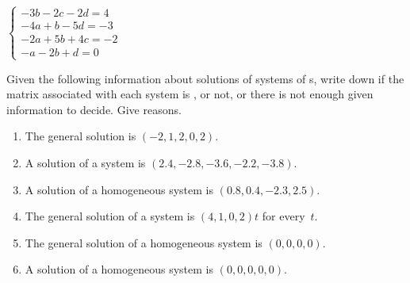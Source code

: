 \begin{exercise}
\begin{Parts}
\begin{OmitV1}
\item \(\begin{cases}-3b-2c-2d=4
\\-4a+b-5d=-3
\\-2a+5b+4c=-2
\\-a-2b+d=0 \end{cases}\)
\end{OmitV1}

\end{Parts}
\end{exercise}




\begin{exercise}  
Given the following information about solutions of systems of s, write down if the matrix associated with each system is , or not, or there is not enough given information to decide.  
Give reasons.
\begin{enumerate}
\item The general solution is \((-2,1,2,0,2)\).

\item A solution of a system is \((2.4,-2.8,-3.6,-2.2,-3.8)\).

\item A solution of a homogeneous system is \((0.8,0.4,-2.3,2.5)\).%

\item The general solution of a system is \((4,1,0,2)t\) for every~\(t\).%

\item The general solution of a homogeneous system is \((0,0,0,0)\).%

\item A solution of a homogeneous system is \((0,0,0,0,0)\).

\end{enumerate}
\end{exercise}





